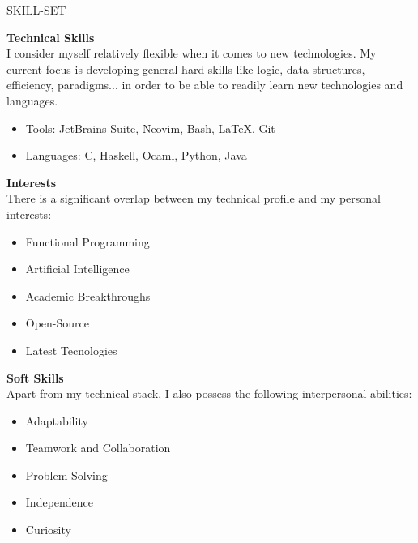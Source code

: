 \documentclass [10pt, a4paper] {extarticle}
\newcommand{\sectionlinethickness} {1.3 pt }
\newcommand{\leftcolumwidth} {0.18 }
\newcommand{\rightcolumwidth}{ 0.82 }
\newcommand {\sectiontitle}[1] {
    \begin {flushleft}
    \begin {minipage}[c]{\leftcolumwidth\textwidth}
        \begin {flushright}
        \!\MakeUppercase {#1}
        \hspace* {10px}
        \end {flushright}
    \end {minipage}
        \begin {tikzpicture}
            \hspace{-4px}
            \draw [line width=\sectionlinethickness, namelines] (1,0) -- (15.363,0);
        \end {tikzpicture}
    \end {flushleft}
}
\begin{document}

    \sectiontitle {skill-set}

    \begin {flushright}
    \begin {minipage} [t] {\rightcolumwidth\textwidth}

        \textbf {Technical Skills} \\ [4px]
        I consider myself relatively flexible when it comes to new technologies. My current focus is developing general hard skills like logic, data structures, efficiency, paradigms... in order to be able to readily learn new technologies and languages.
        \vspace {-2px}
        \begin {itemize} [noitemsep]
            \item Tools: JetBrains Suite, Neovim, Bash, LaTeX, Git
            \item Languages: C, Haskell, Ocaml, Python, Java
        \end {itemize}

        \begin {minipage} [t] {0.475\textwidth}
            \textbf {Interests} \\ [4px]
            There is a significant overlap between my technical profile and my personal interests:
            \vspace {-3px}
            \begin {itemize} [noitemsep]
                \item Functional Programming
                \item Artificial Intelligence
                \item Academic Breakthroughs
                \item Open-Source
                \item Latest Tecnologies
            \end {itemize}
        \end {minipage}
        \hfill
        \begin {minipage} [t] {0.475\textwidth}
            \textbf {Soft Skills} \\ [4px]
            Apart from my technical stack, I also possess the following interpersonal abilities:
            \vspace {-3px}
            \begin {itemize} [noitemsep]
                \item Adaptability
                \item Teamwork and Collaboration
                \item Problem Solving
                \item Independence
                \item Curiosity
            \end {itemize}
        \end {minipage}
    \end {minipage}
    \end {flushright}
\end{document}
